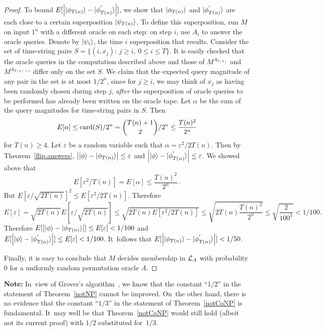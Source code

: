 \begin{proof}
To bound $E[{\left| {| \phi_{T(n)} \rangle} - {| \phi^{'}_{T(n)} \rangle} \right|}]$,
we show that ${| \phi_{T(n)} \rangle}$ and
${| \phi^{'}_{T(n)} \rangle}$ are each close to a certain superposition
${| \psi_{T(n)} \rangle}$.
To define this superposition, run $M$ on input $1^n$ with a
different oracle on each
step: on step $i$, use $A_i$ to answer the oracle queries.
Denote by ${| \psi_i \rangle}$, the time $i$ superposition that results.
Consider the set of time-string pairs
\mbox{$S = \{(i, x_j ) :~j \geq i,~0 \leq i \leq T\}$}.
It is easily checked that the oracle queries
in the computation described above and those
of $M^{A_{T(n)}}$ and $M^{A_{T(n)+1}}$ differ only on the set $S$.
We claim that the expected query magnitude of any pair in the
set is at most $1/2^n$, since for $j \geq i$, we may
think of $x_j$ as having been randomly chosen during step $j$,
{\em after\/} the superposition of oracle queries to be performed
has already been written on the oracle tape.
Let $\alpha$ be the
sum of the query magnitudes for time-string pairs in $S$.  Then
\[ E[\alpha] \leq {\mbox{card}(S)}/2^n =
{T(n)+1 \choose 2} /2^n \leq \frac {T(n)^2}{2^n} \]
for $T(n) \geq 4$.  Let $\varepsilon$ be a random variable such that
$\alpha = \varepsilon^2/2 T(n)$. Then by Theorem~\ref{flip.answers},
${\left| {| \phi \rangle} - {| \phi_{T(n)} \rangle} \right|} \leq \varepsilon$
and ${\left| {| \phi \rangle} - {| \phi^{'}_{T(n)} \rangle} \right|} \leq \varepsilon$.
We showed above that
\[E[\varepsilon^2/T(n)] = E[\alpha] \leq \frac {T(n)^2}{2^n}\,.\]
But $E[\varepsilon/\sqrt{2 T(n)}]^2 \leq E[\varepsilon^2/2 T(n)]$.  Therefore
\[ E[\varepsilon] = \sqrt{2 T(n)}E[\varepsilon/\sqrt{2 T(n)}] \leq
\sqrt{2 T(n) E[\varepsilon^2/2 T(n)]} \leq \sqrt{2 T(n) \frac{T(n)^2}{2^n}}
\leq \sqrt{\frac{2}{100^3}} < 1/100 . \]
Therefore $E[{\left| {| \phi \rangle} - {| \phi_{T(n)} \rangle} \right|}] \leq E[\varepsilon] < 1/100$
and $E[{\left| {| \phi \rangle} - {| \phi^{'}_{T(n)} \rangle} \right|}] \leq E[\varepsilon]
< 1/100$.  It~follows that $E[{\left| {| \phi_{T(n)} \rangle} -
{| \phi^{'}_{T(n)} \rangle} \right|}] < 1/50$.

Finally, it is easy to conclude that $M$ decides membership
in ${\cal L}_A$ with probability $0$ for a uniformly random
permutation oracle $A$.
\end{proof}

\noindent
{\bf Note:}
In~view of Grover's algorithm~\cite{Gr}, we know that
the constant ``$1/2$'' in the statement of Theorem~\ref{notNP}
cannot be improved.  On~the other hand, there is no evidence
that the constant ``$1/3$'' in the statement of Theorem~\ref{notCoNP}
is fundamental.  It~may well be that Theorem~\ref{notCoNP}
would still hold (albeit not its current proof) with $1/2$ substituted
for~$1/3$.

